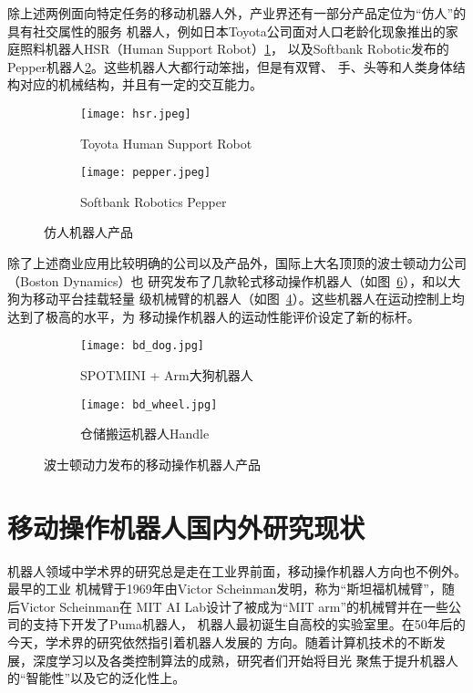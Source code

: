除上述两例面向特定任务的移动机器人外，产业界还有一部分产品定位为“仿人”的具有社交属性的服务
机器人，例如日本Toyota公司面对人口老龄化现象推出的家庭照料机器人HSR（Human Support Robot）\ref{fig:hsr}，
以及Softbank Robotic发布的Pepper机器人\ref{fig:pepper}。这些机器人大都行动笨拙，但是有双臂、
手、头等和人类身体结构对应的机械结构，并且有一定的交互能力。

\begin{figure}
\centering
\begin{subfigure}{.5\textwidth}
  \centering
  \texttt{[image: hsr.jpeg]}
  \caption{Toyota Human Support Robot}
  \label{fig:hsr}
\end{subfigure}%
\begin{subfigure}{.5\textwidth}
  \centering
  \texttt{[image: pepper.jpeg]}
  \caption{Softbank Robotics Pepper}
  \label{fig:pepper}
\end{subfigure}
\label{fig:hsr_pepper}
\caption{仿人机器人产品}
\end{figure}

除了上述商业应用比较明确的公司以及产品外，国际上大名顶顶的波士顿动力公司（Boston Dynamics）也
研究发布了几款轮式移动操作机器人（如图~\ref{fig:bd_wheel}），和以大狗为移动平台挂载轻量
级机械臂的机器人（如图~\ref{fig:bd_dog}）。这些机器人在运动控制上均达到了极高的水平，为
移动操作机器人的运动性能评价设定了新的标杆。

\begin{figure}
\centering
\begin{subfigure}{.5\textwidth}
  \centering
  \texttt{[image: bd\_dog.jpg]}
  \caption{SPOTMINI + Arm大狗机器人}
  \label{fig:bd_dog}
\end{subfigure}%
\begin{subfigure}{.5\textwidth}
  \centering
  \texttt{[image: bd\_wheel.jpg]}
  \caption{仓储搬运机器人Handle}
  \label{fig:bd_wheel}
\end{subfigure}
\caption{波士顿动力发布的移动操作机器人产品}
\end{figure}


\section{移动操作机器人国内外研究现状}
\label{cha:research}

机器人领域中学术界的研究总是走在工业界前面，移动操作机器人方向也不例外。最早的工业
机械臂于1969年由Victor Scheinman发明，称为“斯坦福机械臂”，随后Victor Scheinman在
MIT AI Lab设计了被成为“MIT arm”的机械臂并在一些公司的支持下开发了Puma机器人\cite{huangxihuanReview}，
机器人最初诞生自高校的实验室里。在50年后的今天，学术界的研究依然指引着机器人发展的
方向。随着计算机技术的不断发展，深度学习以及各类控制算法的成熟，研究者们开始将目光
聚焦于提升机器人的“智能性”以及它的泛化性上。

